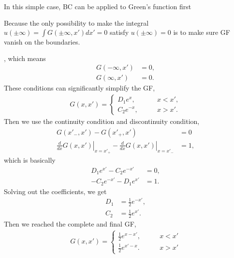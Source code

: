 \documentclass[letterpaper,10pt,english]{sphinxmanual}
\begin{document}
In this simple case, BC can be applied to Green’s function first %
\begin{footnote}[2]\sphinxAtStartFootnote
Because the only possibility to make the integral \(u(\pm\infty)=\int G(\pm\infty,x') dx'=0\) satisfy \(u(\pm\infty)=0\) is to make sure GF vanish on the boundaries.
%
\end{footnote}, which means
\begin{equation*}
\begin{split}G(-\infty,x') &= 0, \\
G(\infty,x') &= 0.\end{split}
\end{equation*}
These conditions can significantly simplify the GF,
\begin{equation*}
\begin{split}G(x,x') = \begin{cases}
D_1 e^{x}, & \qquad x<x',\\
C_2 e^{-x}, & \qquad x>x'.
\end{cases}\end{split}
\end{equation*}
Then we use the continuity condition and discontinuity condition,
\begin{equation*}
\begin{split}G(x'_-,x') - G(x'_+,x') &= 0\\
\left.\frac{d}{dx}G(x,x')\right\vert_{x=x'_+} - \left.\frac{d}{dx}G(x,x')\right\vert_{x=x'_-} &= 1,\end{split}
\end{equation*}
which is basically
\begin{equation*}
\begin{split}D_1 e^{x'} - C_2 e^{-x'} &= 0,\\
- C_2 e^{-x'} - D_1 e^{x'} & =1.\end{split}
\end{equation*}
Solving out the coefficients, we get
\begin{equation*}
\begin{split}D_1 & = \frac{1}{2}e^{-x'},\\
C_2 &= \frac{1}{2}e^{x'}.\end{split}
\end{equation*}
Then we reached the complete and final GF,
\begin{equation*}
\begin{split}G(x,x') = \begin{cases}
\frac{1}{2}e^{x-x'}, & \qquad x<x'\\
\frac{1}{2}e^{x' - x}. & \qquad x>x'
\end{cases}\end{split}
\end{equation*}
\end{document}
